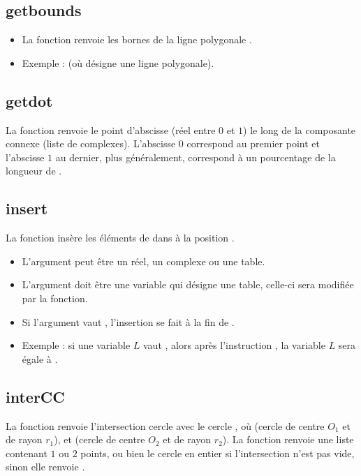 \subsection{getbounds}

\begin{itemize}
    \item La fonction  renvoie les bornes  de la ligne polygonale .
    \item Exemple :  (où  désigne une ligne polygonale).
\end{itemize}

\subsection{getdot}
La fonction  renvoie le point d'abscisse  (réel entre $0$ et $1$) le long de la composante connexe  (liste de complexes). L'abscisse $0$ correspond au premier point et l'abscisse $1$ au dernier, plus généralement,  correspond à un pourcentage de la longueur de .

\subsection{insert}
La fonction  insère les éléments de  dans  à la position .

\begin{itemize}
    \item L'argument  peut être un réel, un complexe ou une table.
    \item L'argument  doit être une variable qui désigne une table, celle-ci sera modifiée par la fonction.
    \item Si l'argument  vaut \nil, l'insertion se fait à la fin de .
    \item Exemple : si une variable $L$ vaut , alors après l'instruction , la variable $L$ sera égale à .
\end{itemize}

\subsection{interCC}
La fonction  renvoie l'intersection cercle  avec le cercle , où  (cercle de centre $O_1$ et de rayon $r_1$), et  (cercle de centre $O_2$ et de rayon $r_2$). La fonction renvoie une liste contenant $1$ ou $2$ points, ou bien le cercle en entier si l'intersection n'est pas vide, sinon elle renvoie \nil.

